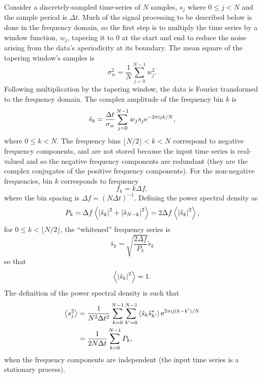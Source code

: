 \documentclass[10pt]{article}
\begin{document}
Consider a discretely-sampled time-series of \(N\) samples, \(s_j\) where
\(0 \leq j < N\) and the sample period is \(\Delta t\).  Much of the signal
processing to be described below is done in the frequency domain, so the
first step is to multiply the time series by a window function, \(w_{j}\),
tapering it to 0 at the start and end to reduce the noise arising from the
data's aperiodicity at its boundary.  The mean square of the tapering
window's samples is
\begin{equation}
\sigma_{w}^{2}
   = \frac{1}{N} \sum_{j = 0}^{N - 1} w_{j}^2.
\end{equation}
Following multiplication by the tapering window, the data is Fourier
transformed to the frequency domain.  The complex amplitude of the
frequency bin \(k\) is
\begin{equation}
\tilde{s}_{k}
   = \frac{\Delta t}{\sigma_{w}} \sum_{j = 0}^{N - 1} w_{j} s_{j} \mathrm{e}^{-2
   \pi \mathrm{i} j k / N},
\end{equation}
where \(0 \leq k < N\).  The frequency bins \(\lfloor N / 2 \rfloor < k <
N\) correspond to negative frequency components, and are not stored because
the input time series is real-valued and so the negative frequency
components are redundant (they are the complex conjugates of the positive
frequency components).  For the non-negative frequencies, bin \(k\)
corresponds to frequency
\begin{equation}
f_{k}
   = k \Delta f,
\end{equation}
where the bin spacing is \(\Delta f = (N \Delta t)^{-1}\).  Defining the
power spectral density as
\begin{equation}
P_{k}
   = \Delta f \left\langle\left|\tilde{s}_{k}\right|^{2} + \left|\tilde{s}_{N
   - k}\right|^{2}\right\rangle
   = 2 \Delta f \left\langle\left|\tilde{s}_{k}\right|^{2}\right\rangle,
\end{equation}
for \(0 \leq k < \lfloor N / 2 \rfloor\), the ``whitened'' frequency series
is
\begin{equation}
\hat{s}_{k}
   = \sqrt{\frac{2 \Delta f}{P_{k}}} \tilde{s}_{k}
\end{equation}
so that
\begin{equation}
\label{eqn3}
\left\langle\left|\hat{s}_{k}\right|^2\right\rangle
   = 1.
\end{equation}
The definition of the power spectral density is such that
\begin{align}
\label{eqn9}
\left\langle s_{j}^{2}\right\rangle
   & = \frac{1}{N^{2} \Delta t^{2}} \sum_{k = 0}^{N - 1} \sum_{k' = 0}^{N -
   1} \left\langle\tilde{s}_{k} \tilde{s}^{*}_{k'}\right\rangle \mathrm{e}^{2 \pi \mathrm{i} j (k - k')
   / N}
   \\
   & = \frac{1}{2 N \Delta t} \sum_{k = 0}^{N - 1} P_{k},
\end{align}
when the frequency components are independent (the input time series is a
stationary process).
\end{document}
